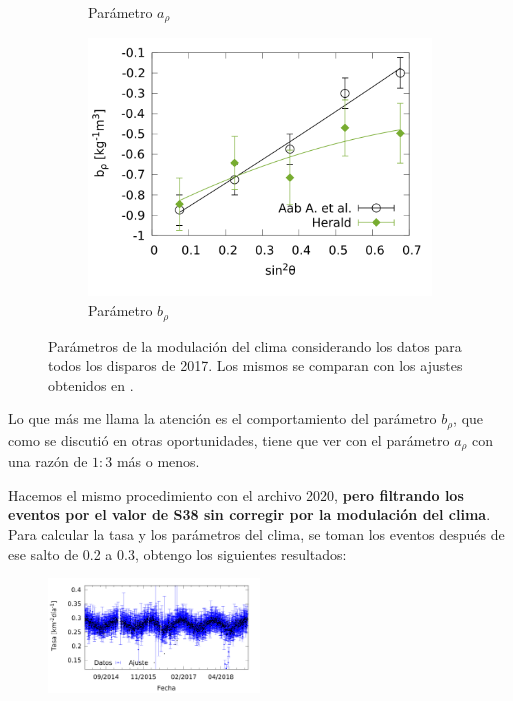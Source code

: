 \begin{figure}[H]
\begin{subfigure}[b]{0.5\textwidth}
          \caption{Parámetro $a_{\rho}$ }
          \label{fig:arho_2017_1EeV}
          \end{subfigure}%
          \hspace{\fill}
          \begin{subfigure}[b]{\textwidth}
          \centering
          \includegraphics[width=0.5\linewidth]{../0_Introduccion/params/brho_2017_above_1EeV.png}
          \caption{Parámetro  $b_\rho$   }
          \label{fig:brho_2017_1EeV}
          \end{subfigure}%
          \caption{Parámetros de la modulación del clima considerando los datos para todos los disparos de 2017. Los mismos se comparan con los ajustes obtenidos en \cite{aab2017impact}.}\label{fig:parameters_2017_1EeV}
        \end{figure}

        Lo que más me llama la atención es el comportamiento del parámetro $b_\rho$, que como se discutió en otras oportunidades, tiene que ver con el parámetro $a_\rho$ con una razón de  $1:3$ más o menos. 



      Hacemos el mismo procedimiento con el archivo 2020, {\bf pero filtrando los eventos por el valor de S38 sin corregir por la modulación del clima}. Para calcular la tasa y los parámetros del clima, se toman los eventos después de ese salto de 0.2 a 0.3, obtengo los siguientes resultados:

        \begin{figure}[H]
          \centering
          \includegraphics[width=0.5\textwidth]{../0_Introduccion/daily_rate/daily_rate_AllTriggers_2020_1EeV.png}
        \end{figure}


